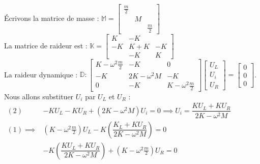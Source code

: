 \documentclass[12pt,a4paper]{article}
\begin{document}
	Écrivons la matrice de masse : $\mathbb{M} = \left[\begin{matrix}
		\frac m2 \\
		& M\\
		& & \frac m2
	\end{matrix}\right]$\\
	La matrice de raideur est : $\mathbb{K} = \left[\begin{matrix}
		K & -K \\
		-K & K+K & -K \\
		& -K & K
	\end{matrix}\right]$\\
	La raideur dynamique : $\mathbb{D} : \left[\begin{matrix}
		K-\omega^2 \frac m2 & -K & 0 \\
		-K & 2K-\omega^2 M & -K \\
		0 & -K & K-\omega^2\frac m2
	\end{matrix}\right]\left[\begin{matrix}
		U_L\\U_i\\U_R
	\end{matrix}\right]=\left[\begin{matrix}
		0 \\ 0 \\ 0
	\end{matrix}\right]$.\\
	Nous allons substituer $U_i$ par $U_L$ et $U_R$ :\\
	$\begin{aligned}
		(2) & -KU_L-KU_R+(2K-\omega^2 M)U_i = 0 \implies U_i = \dfrac{KU_L+KU_R}{2K-\omega^2M}\\
		(1) \implies &  (K-\omega^2\frac m2)U_L-K\left(\dfrac{K_L+KU_R}{2K-\omega^2 M}\right) = 0 \\
		& - K\left(\dfrac{KU_L+KU_R}{2K-\omega^2M}\right) + (K-\omega^2\frac m2)U_R = 0
	\end{aligned}$
	
	\vspace{.5cm}
	
\end{document}

